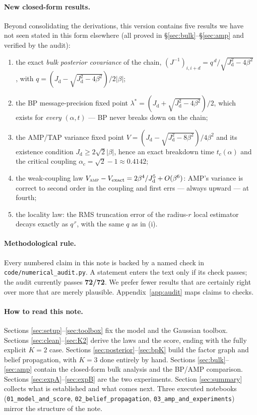 \documentclass[11pt]{article}
\theoremstyle{definition}
\newcommand{\Jd}{J_{\mathrm d}}
\begin{document}
\paragraph{New closed-form results.}
Beyond consolidating the derivations, this version contains five results we
have not seen stated in this form elsewhere (all proved in
\S\ref{sec:bulk}--\S\ref{sec:amp} and verified by the audit):
\begin{enumerate}[leftmargin=1.6em, itemsep=1pt]
\item the exact \emph{bulk posterior covariance} of the chain,
  $(J^{-1})_{i,i+d}=q^{\,d}/\sqrt{\Jd^2-4\beta^2}$, with
  $q=(\Jd-\sqrt{\Jd^2-4\beta^2})/2|\beta|$;
\item the BP message-precision fixed point
  $\lambda^\ast=(\Jd+\sqrt{\Jd^2-4\beta^2})/2$, which exists for \emph{every}
  $(\alpha,t)$ --- BP never breaks down on the chain;
\item the AMP/TAP variance fixed point
  $V=(\Jd-\sqrt{\Jd^2-8\beta^2})/4\beta^2$ and its existence condition
  $\Jd\ge2\sqrt2|\beta|$, hence an exact breakdown time $t_c(\alpha)$ and the
  critical coupling $\alpha_c=\sqrt2-1\approx0.4142$;
\item the weak-coupling law $V_{\textsc{amp}}-V_{\mathrm{exact}}
  =2\beta^4/\Jd^5+O(\beta^6)$: AMP's variance is correct to second order in
  the coupling and first errs --- always upward --- at fourth;
\item the locality law: the RMS truncation error of the radius-$r$ local
  estimator decays exactly as $q^{\,r}$, with the same $q$ as in (i).
\end{enumerate}

\paragraph{Methodological rule.}
Every numbered claim in this note is backed by a named check in
\texttt{code/numerical\_audit.py}. A statement enters the text only if its
check passes; the audit currently passes \textbf{72/72}. We prefer fewer
results that are certainly right over more that are merely plausible.
Appendix~\ref{app:audit} maps claims to checks.

\paragraph{How to read this note.}
Sections \ref{sec:setup}--\ref{sec:toolbox} fix the model and the Gaussian
toolbox. Sections \ref{sec:clean}--\ref{sec:K2} derive the laws and the score,
ending with the fully explicit $K=2$ case. Sections
\ref{sec:posterior}--\ref{sec:bpK} build the factor graph and belief
propagation, with $K=3$ done entirely by hand. Sections
\ref{sec:bulk}--\ref{sec:amp} contain the closed-form bulk analysis and the
BP/AMP comparison. Sections \ref{sec:expA}--\ref{sec:expB} are the two
experiments. Section \ref{sec:summary} collects what is established and what
comes next. Three executed notebooks
(\texttt{01\_model\_and\_score}, \texttt{02\_belief\_propagation},
\texttt{03\_amp\_and\_experiments}) mirror the structure of the note.
\end{document}
